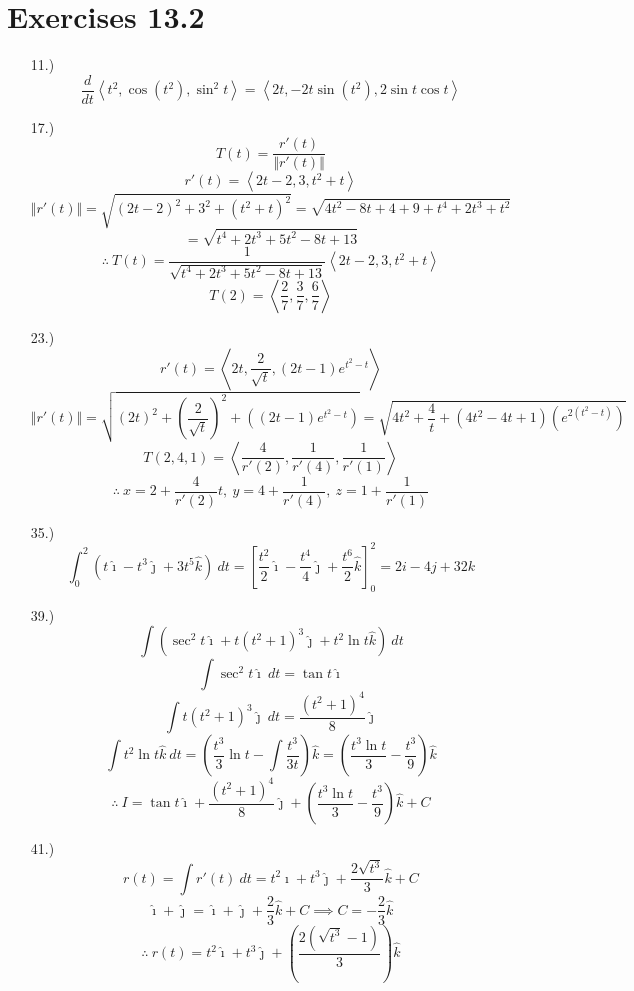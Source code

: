 \documentclass[12pt]{article}
\newcommand{\angleb}[1]{\left\langle#1\right\rangle}
\newcommand{\parns}[1]{\left(#1\right)}
\begin{document}
\section*{Exercises 13.2}
\begin{itemize}
    \item [11.)] \[\frac{d}{dt}\angleb{t^2,\cos(t^2),\sin^2t}=\angleb{2t,-2t\sin(t^2),2\sin t\cos t}\]

    \item [17.)] \[T(t)=\frac{r'(t)}{\Vert r'(t)\Vert}\]
          \[r'(t)=\angleb{2t-2,3,t^2+t}\]
          \[\Vert r'(t)\Vert=\sqrt{(2t-2)^2+3^2+(t^2+t)^2}=\sqrt{4t^2-8t+4+9+t^4+2t^3+t^2}\]
          \[=\sqrt{t^4+2t^3+5t^2-8t+13}\]
          \[\therefore\ T(t)=\frac{1}{\sqrt{t^4+2t^3+5t^2-8t+13}}\angleb{2t-2,3,t^2+t}\]
          \[T(2)=\angleb{\frac{2}{7},\frac{3}{7},\frac{6}{7}}\]

    \item [23.)] \[r'(t)=\angleb{2t,\frac{2}{\sqrt t},(2t-1)e^{t^2-t}}\]
    \[\Vert r'(t)\Vert=\sqrt{(2t)^2+\parns{\frac{2}{\sqrt t}}^2+\parns{(2t-1)e^{t^2-t}}}=\sqrt{4t^2+\frac{4}{t}+(4t^2-4t+1)(e^{2(t^2-t)})}\]
    \[T(2,4,1)=\angleb{\frac{4}{r'(2)},\frac{1}{r'(4)},\frac{1}{r'(1)}}\]
    \[\therefore\ x=2+\frac{4}{r'(2)}t,\ y=4+\frac{1}{r'(4)},\ z=1+\frac{1}{r'(1)}\]

    \item [35.)] \[\int_0^2(t\hat\imath-t^3\hat\jmath+3t^5\hat{k})\ dt=\left[\frac{t^2}{2}\hat\imath-\frac{t^4}{4}\hat\jmath+\frac{t^6}{2}\hat{k}\right]_0^2=2i-4j+32k\]

    \item [39.)] \[\int(\sec^2t\hat\imath+t(t^2+1)^3\hat\jmath+t^2\ln t\hat{k})\ dt\]
          \[\int\sec^2t\hat\imath\ dt=\tan t\hat\imath\]
          \[\int t(t^2+1)^3\hat\jmath\ dt=\frac{(t^2+1)^4}{8}\hat\jmath\]
          \[\int t^2\ln t\hat{k}\ dt=\left(\frac{t^3}{3}\ln t-\int\frac{t^3}{3t}\right)\hat{k}=\left(\frac{t^3\ln t}{3}-\frac{t^3}{9}\right)\hat{k}\]
          \[\therefore\ I=\tan t\hat\imath+\frac{(t^2+1)^4}{8}\hat\jmath+\left(\frac{t^3\ln t}{3}-\frac{t^3}{9}\right)\hat{k}+C\]

    \item [41.)] \[r(t)=\int r'(t)\ dt=t^2\hat\imath+t^3\hat\jmath+\frac{2\sqrt{t^3}}{3}\hat{k}+C\]
          \[\hat\imath+\hat\jmath=\hat\imath+\hat\jmath+\frac{2}{3}\hat{k}+C\implies C=-\frac{2}{3}\hat{k}\]
          \[\therefore\ r(t)=t^2\hat\imath+t^3\hat\jmath+\left(\frac{2\left(\sqrt{t^3}-1\right)}{3}\right)\hat{k}\]
\end{itemize}
\end{document}
